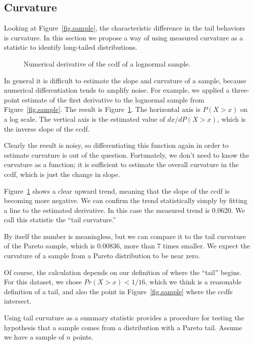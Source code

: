 \documentclass[twocolumn,11pt]{infocom}
\begin{document}
\subsection {Curvature}

Looking at Figure~\ref{fig.sample}, the characteristic difference in
the tail behaviors is curvature.  In this section we propose a way
of using measured curvature as a statistic to identify long-tailed
distributions.

\begin{figure}[tb]
\centerline{}
\caption{Numerical derivative of the ccdf of a lognormal sample.}
\label{fig.der}
\end{figure}

In general it is difficult to estimate the slope and curvature
of a sample, because numerical differentiation
tends to amplify noise.
For example, we applied a three-point estimate of the first
derivative to the lognormal sample from Figure~\ref{fig.sample}.
The result is Figure~\ref{fig.der}.  The horizontal axis
is $P (X>x)$ on a log scale.  The vertical axis is the estimated
value of $dx / d P (X>x)$, which is the inverse slope
of the ccdf.

Clearly the result is noisy, so differentiating
this function again in order to estimate curvature is out of the
question.  Fortunately, we don't need to know the
curvature as a function; it is sufficient to estimate the overall
curvature in the ccdf, which is just the change in slope.

Figure~\ref{fig.der} shows a clear upward trend, meaning that the
slope of the ccdf is becoming more negative.  We can confirm the
trend statistically simply by fitting a line to the estimated
derivative.  In this case the measured trend is 0.0620.
We call this statistic the ``tail curvature.''

By itself the number is meaningless, but we can compare it to the tail
curvature of the Pareto sample, which is 0.00836, more than 7 times
smaller.  We expect the curvature of a sample from a
Pareto distribution to be near zero.

Of course, the calculation depends on our definition of where the
``tail'' begins.  For this dataset, we chose $Pr (X>x) < 1/16$, which
we think is a reasonable definition of a tail, and also the point in
Figure~\ref{fig.sample} where the ccdfs intersect.

Using tail curvature as a summary statistic provides a procedure for
testing the hypothesis that a sample comes from a distribution with a
Pareto tail.  Assume we have a sample of $n$ points.
\end{document}
